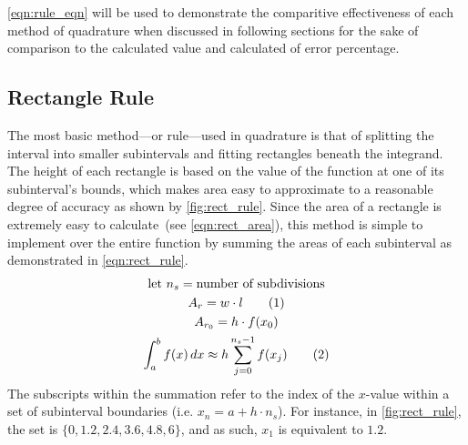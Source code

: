 \documentclass{paper}
\begin{document}
\cref{eqn:rule_eqn} will be used to demonstrate the comparitive effectiveness of each method of quadrature when discussed in following sections for the sake of comparison to the calculated value and calculated of error percentage.
%
\subsection{Rectangle Rule}
\label{sec:rect_rule}
The most basic method---or rule---used in quadrature is that of splitting the interval into smaller subintervals and fitting rectangles beneath the integrand.
The height of each rectangle is based on the value of the function at one of its subinterval's bounds, which makes area easy to approximate to a reasonable degree of accuracy as shown by \cref{fig:rect_rule}.
Since the area of a rectangle is extremely easy to calculate~(see \cref{eqn:rect_area}), this method is simple to implement over the entire function by summing the areas of each subinterval as demonstrated in \cref{eqn:rect_rule}.\autocite{num_methods}
%
\begin{gather*}
    \text{let } n_s = \text{number of subdivisions}                                             \\
    A_{r} = w \cdot l \tageq\label{eqn:rect_area}                                               \\
    A_{r_{0}} = h \cdot f(x_0)                                                                  \\
    \int_a^b f(x) \,dx \approx h \sum^{n_s-1}_{j=0}f(x_j) \tageq\label{eqn:rect_rule}
\end{gather*}
%
The subscripts within the summation refer to the index of the \(x\)-value within a set of subinterval boundaries (i.e. \(x_n = a + h \cdot n_s\)).
For instance, in \cref{fig:rect_rule}, the set is \(\{0, 1.2, 2.4, 3.6, 4.8, 6\}\), and as such, \(x_1\) is equivalent to \(1.2\).
\end{document}

